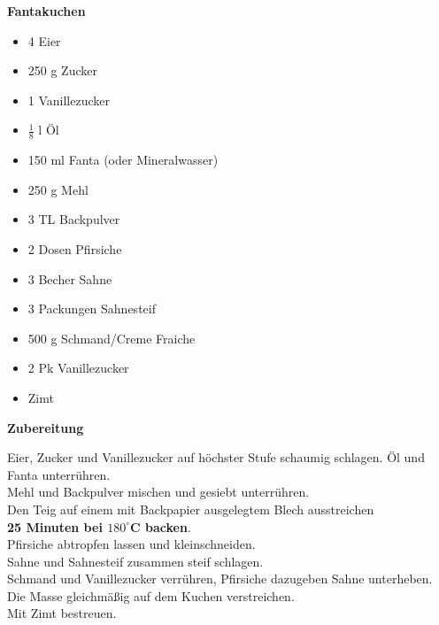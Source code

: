 
\parindent0pt	

\pagestyle{empty}


\textbf{{\LARGE Fantakuchen}}%


\hrulefill
\vspace*{\fill}
\begin{multicols}{2}	


\begin{itemize}
\item 4 Eier
\item 250 g Zucker
\item 1 Vanillezucker
\item $\frac{1}{8}$ l Öl
\item 150 ml Fanta (oder Mineralwasser)
\item 250 g Mehl
\item 3 TL Backpulver

\item 2 Dosen Pfirsiche
\item 3 Becher Sahne
\item 3 Packungen Sahnesteif

\item 500 g Schmand/Creme Fraiche
\item 2 Pk Vanillezucker

\item Zimt
\end{itemize}

\end{multicols}
\vfill
\newpage
\textbf{{\LARGE Zubereitung}}%

\hrulefill

\vspace*{\fill}
\begin{multicols}{2}


Eier, Zucker und Vanillezucker auf höchster Stufe schaumig schlagen.
Öl und Fanta unterrühren.\\

Mehl und Backpulver mischen und gesiebt unterrühren.\\
Den Teig auf einem mit Backpapier ausgelegtem Blech ausstreichen\\

\textbf{25 Minuten bei $180^\circ$C backen}.\\
Pfirsiche abtropfen lassen und kleinschneiden.\\
Sahne und Sahnesteif zusammen steif schlagen.\\
Schmand und Vanillezucker verrühren, Pfirsiche dazugeben
Sahne unterheben.\\

Die Masse gleichmäßig auf dem Kuchen verstreichen.\\
Mit Zimt bestreuen.


\end{multicols}
\vfill
